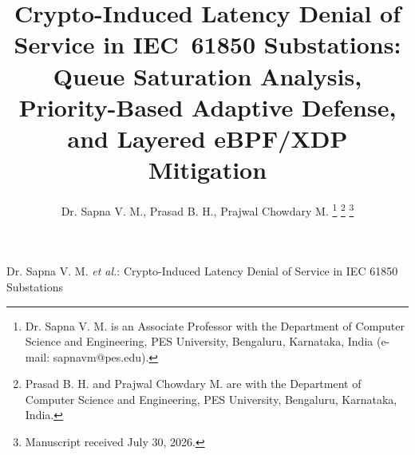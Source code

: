 \documentclass[journal]{IEEEtran}
\begin{document}
\title{Crypto-Induced Latency Denial of Service in IEC~61850 Substations: Queue Saturation Analysis, Priority-Based Adaptive Defense, and Layered eBPF/XDP Mitigation}

\author{Dr. Sapna V. M., Prasad B. H., Prajwal Chowdary M.%
\thanks{Dr. Sapna V. M. is an Associate Professor with the Department of Computer Science and Engineering, PES University, Bengaluru, Karnataka, India (e-mail: sapnavm@pes.edu).}%
\thanks{Prasad B. H. and Prajwal Chowdary M. are with the Department of Computer Science and Engineering, PES University, Bengaluru, Karnataka, India.}%
\thanks{Manuscript received July 30, 2026.}
}

%
{Dr. Sapna V. M. \MakeLowercase{\textit{et al.}}: Crypto-Induced Latency Denial of Service in IEC 61850 Substations}

\maketitle
\end{document}
